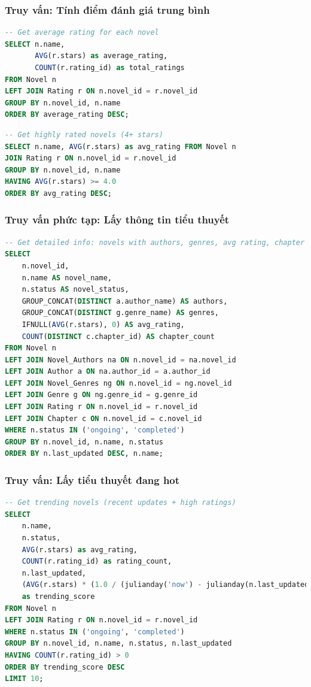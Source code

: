 \documentclass[12pt,aspectratio=169,handout]{beamer}
\begin{document}
\begin{frame}
\frametitle{Truy vấn: Tính điểm đánh giá trung bình}
\begin{lstlisting}[language=SQL, basicstyle=\small\ttfamily]
-- Get average rating for each novel
SELECT n.name, 
       AVG(r.stars) as average_rating, 
       COUNT(r.rating_id) as total_ratings
FROM Novel n
LEFT JOIN Rating r ON n.novel_id = r.novel_id
GROUP BY n.novel_id, n.name
ORDER BY average_rating DESC;
\end{lstlisting}

\framebreak

\begin{lstlisting}[language=SQL, basicstyle=\small\ttfamily]
-- Get highly rated novels (4+ stars)
SELECT n.name, AVG(r.stars) as avg_rating FROM Novel n
JOIN Rating r ON n.novel_id = r.novel_id
GROUP BY n.novel_id, n.name
HAVING AVG(r.stars) >= 4.0
ORDER BY avg_rating DESC;
\end{lstlisting}
\end{frame}

\begin{frame}[fragile]
\frametitle{Truy vấn phức tạp: Lấy thông tin tiểu thuyết}
\begin{lstlisting}[language=SQL, basicstyle=\tiny\ttfamily]
-- Get detailed info: novels with authors, genres, avg rating, chapter count
SELECT 
    n.novel_id,
    n.name AS novel_name,
    n.status AS novel_status,
    GROUP_CONCAT(DISTINCT a.author_name) AS authors,
    GROUP_CONCAT(DISTINCT g.genre_name) AS genres,
    IFNULL(AVG(r.stars), 0) AS avg_rating,
    COUNT(DISTINCT c.chapter_id) AS chapter_count
FROM Novel n
LEFT JOIN Novel_Authors na ON n.novel_id = na.novel_id
LEFT JOIN Author a ON na.author_id = a.author_id
LEFT JOIN Novel_Genres ng ON n.novel_id = ng.novel_id
LEFT JOIN Genre g ON ng.genre_id = g.genre_id
LEFT JOIN Rating r ON n.novel_id = r.novel_id
LEFT JOIN Chapter c ON n.novel_id = c.novel_id
WHERE n.status IN ('ongoing', 'completed')
GROUP BY n.novel_id, n.name, n.status
ORDER BY n.last_updated DESC, n.name;
\end{lstlisting}
\end{frame}

\begin{frame}[fragile]
\frametitle{Truy vấn: Lấy tiểu thuyết đang hot}
\begin{lstlisting}[language=SQL, basicstyle=\scriptsize\ttfamily]
-- Get trending novels (recent updates + high ratings)
SELECT 
    n.name, 
    n.status,
    AVG(r.stars) as avg_rating,
    COUNT(r.rating_id) as rating_count,
    n.last_updated,
    (AVG(r.stars) * (1.0 / (julianday('now') - julianday(n.last_updated) + 1))) 
    as trending_score
FROM Novel n
LEFT JOIN Rating r ON n.novel_id = r.novel_id
WHERE n.status IN ('ongoing', 'completed')
GROUP BY n.novel_id, n.name, n.status, n.last_updated
HAVING COUNT(r.rating_id) > 0
ORDER BY trending_score DESC
LIMIT 10;
\end{lstlisting}
\end{frame}
\end{document}
